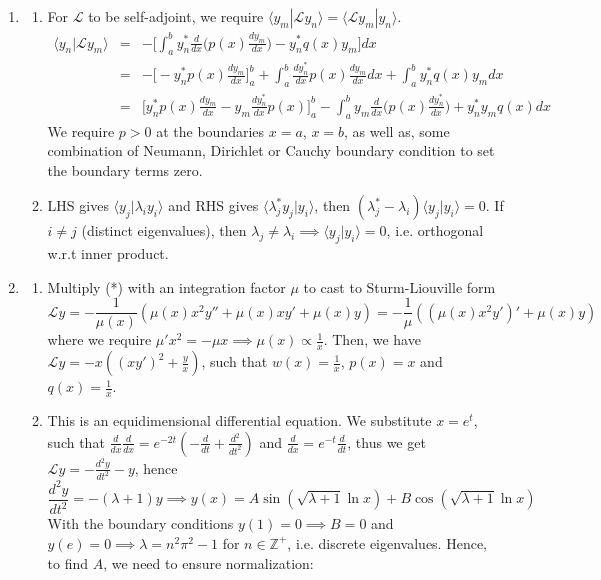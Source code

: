 \documentclass[a4paper]{article}
\begin{document}
\begin{ans}\leavevmode
\begin{enumerate}[label=(\roman*)]
\item \begin{enumerate}[label=(\alph*)]
\item For $\mathcal{L}$ to be self-adjoint, we require $\langle y_m|\mathcal{L}y_n\rangle=\langle\mathcal{L}y_m|y_n\rangle$.
\begin{eqnarray}
\langle y_n|\mathcal{L}y_m\rangle&=&-\bigg[\int_a^b y_n^*\frac{d}{dx}\bigg(p(x)\frac{dy_m}{dx}\bigg)-y_n^*q(x)y_m\bigg]dx\nonumber\\&=&-\bigg[-y_n^*p(x)\frac{dy_m}{dx}\bigg]_a^b+\int_a^b \frac{dy_n^*}{dx}p(x)\frac{dy_m}{dx}dx+\int_a^by_n^*q(x)y_mdx\nonumber\\&=&\bigg[y_n^*p(x)\frac{dy_m}{dx}-y_m\frac{dy_n^*}{dx}p(x)\bigg]_a^b-\int_a^b y_m\frac{d}{dx}\bigg(p(x)\frac{dy_n^*}{dx}\bigg)+y_n^*y_mq(x)dx\nonumber
\end{eqnarray}
We require $p>0$ at the boundaries $x=a$, $x=b$, as well as, some combination of Neumann, Dirichlet or Cauchy boundary condition to set the boundary terms zero. 
\item LHS gives $\langle y_j|\lambda_iy_i\rangle$ and RHS gives $\langle\lambda_j^*y_j|y_i\rangle$, then $(\lambda_j^*-\lambda_i)\langle y_j|y_i\rangle=0$. If $i\neq j$ (distinct eigenvalues), then $\lambda_j\neq\lambda_i\implies\langle y_j|y_i\rangle=0$, i.e. orthogonal w.r.t inner product.
\end{enumerate}
\item
\begin{enumerate}[label=(\alph*)]
\item Multiply (*) with an integration factor $\mu$ to cast to Sturm-Liouville form
$$\mathcal{L}y=-\frac{1}{\mu(x)}(\mu(x) x^2y''+\mu(x) xy'+\mu(x)y)=-\frac{1}{\mu}((\mu(x)x^2y')'+\mu(x)y)$$
where we require $\mu'x^2=-\mu x\implies\mu(x)\propto\frac{1}{x}$. Then, we have $\mathcal{L}y=-x((xy')^2+\frac{y}{x})$, such that $w(x)=\frac{1}{x}$, $p(x)=x$ and $q(x)=\frac{1}{x}$.
\item This is an equidimensional differential equation. We substitute $x=e^t$, such that $\frac{d}{dx}\frac{d}{dx}=e^{-2t}(-\frac{d}{dt}+\frac{d^2}{dt^2})$ and $\frac{d}{dx}=e^{-t}\frac{d}{dt}$, thus we get $\mathcal{L}y=-\frac{d^2y}{dt^2}-y$, hence 
$$\frac{d^2y}{dt^2}=-(\lambda+1)y\implies y(x)=A\sin(\sqrt{\lambda+1}\ln x)+B\cos(\sqrt{\lambda+1}\ln x)$$
With the boundary conditions $y(1)=0\implies B=0$ and $y(e)=0\implies\lambda=n^2\pi^2-1$ for $n\in\mathbb{Z}^+$, i.e. discrete eigenvalues. Hence, to find $A$, we need to ensure normalization:

\end{enumerate}
\end{enumerate}
\end{ans}
\end{document}
